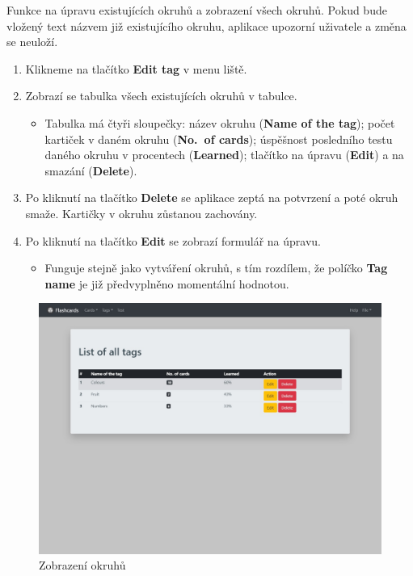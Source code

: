 \documentclass[11pt]{article}
\providecommand{\tightlist}{\setlength{\itemsep}{1pt}\setlength{\parskip}{1pt}}
\begin{document}
Funkce na úpravu existujících okruhů a zobrazení všech okruhů. Pokud
bude vložený text názvem již existujícího okruhu, aplikace upozorní
uživatele a změna se neuloží.

\begin{enumerate}
\def\labelenumi{\arabic{enumi}.}
\tightlist
\item
  Klikneme na tlačítko \textbf{Edit tag} v menu liště.
\item
  Zobrazí se tabulka všech existujících okruhů v tabulce.

  \begin{itemize}
  \tightlist
  \item
    Tabulka má čtyři sloupečky: název okruhu (\textbf{Name of the tag});
    počet kartiček v daném okruhu (\textbf{No.~of cards}); úspěšnost
    posledního testu daného okruhu v procentech (\textbf{Learned});
    tlačítko na úpravu (\textbf{Edit}) a na smazání (\textbf{Delete}).
  \end{itemize}
\item
  Po kliknutí na tlačítko \textbf{Delete} se aplikace zeptá na potvrzení
  a poté okruh smaže. Kartičky v okruhu zůstanou zachovány.
\item
  Po kliknutí na tlačítko \textbf{Edit} se zobrazí formulář na úpravu.

  \begin{itemize}
  \tightlist
  \item
    Funguje stejně jako vytváření okruhů, s tím rozdílem, že políčko
    \textbf{Tag name} je již předvyplněno momentální hodnotou.
  \end{itemize}
\end{enumerate}

\begin{figure}
\centering
\includegraphics{assets/list_tag.jpg}
\caption{Zobrazení okruhů}
\end{figure}
\end{document}
